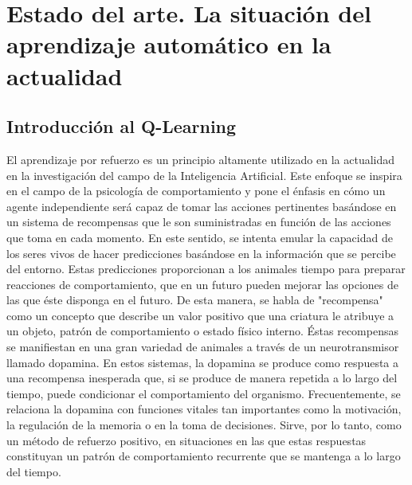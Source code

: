 \documentclass[11pt,spanish,listoffigures,listoftables]{tfgetsinf}
\begin{document}
\chapter{Estado del arte. La situación del aprendizaje automático en la actualidad}

\section{Introducción al Q-Learning}

El aprendizaje por refuerzo es un principio altamente utilizado en la actualidad en la investigación del campo de la Inteligencia Artificial. Este enfoque se inspira en el campo de la psicología de comportamiento y pone el énfasis en cómo un agente independiente será capaz de tomar las acciones pertinentes basándose en un sistema de recompensas que le son suministradas en función de las acciones que toma en cada momento. En este sentido, se intenta emular la capacidad de los seres vivos de hacer predicciones basándose en la información que se percibe del entorno. Estas predicciones \cite{neural_rl} proporcionan a los animales tiempo para preparar reacciones de comportamiento, que en un futuro pueden mejorar las opciones de las que éste disponga en el futuro. De esta manera, se habla de "recompensa" como un concepto que describe un valor positivo que una criatura le atribuye a un objeto, patrón de comportamiento o estado físico interno. Éstas recompensas se manifiestan en una gran variedad de animales a través de un neurotransmisor llamado dopamina. En estos sistemas, la dopamina se produce como respuesta a una recompensa inesperada que, si se produce de manera repetida a lo largo del tiempo, puede condicionar el comportamiento del organismo. Frecuentemente, se relaciona la dopamina con funciones vitales tan importantes como la motivación, la regulación de la memoria o en la toma de decisiones. Sirve, por lo tanto, como un método de refuerzo positivo, en situaciones en las que estas respuestas constituyan un patrón de comportamiento recurrente que se mantenga a lo largo del tiempo. \par  %



\end{document}
